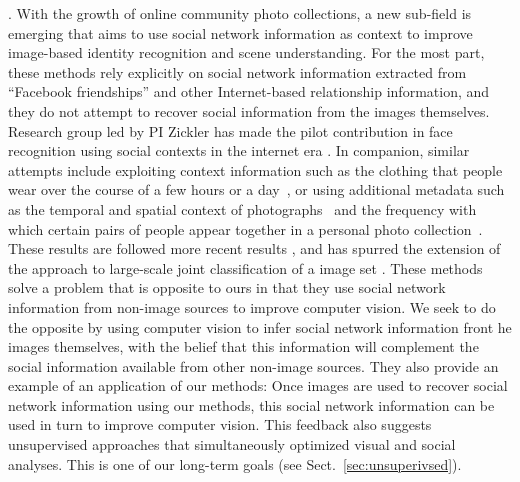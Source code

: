 . With the growth of online community photo collections, a new sub-field is emerging that aims to use social network information as context to improve image-based identity recognition and scene understanding. For the most part, these methods rely explicitly on social network information extracted from ``Facebook friendships'' and other Internet-based relationship information, and they do not attempt to recover social information from the images themselves. Research group led by PI Zickler has made the pilot contribution in face recognition using social contexts in the internet era \cite{Stone2008,Stone2010}. In companion, similar attempts include exploiting context information such as the clothing that people wear over the course of a few hours or a day~\cite{anguelov2007cir, zhang2003aah,  song2006cah, sivic2006fpr}, or using additional metadata such as the temporal and spatial context of photographs~\cite{naaman2005lcr, zhao2006apa} and the frequency with which certain pairs of people appear together in a personal photo collection~\cite{anguelov2007cir}. These results are followed more recent results \cite{Dikmen:classify,LeeBMVC2011,Poppe2012}, and has spurred the extension of the approach to large-scale joint classification of a image set \cite{McAuley:socialclassify}. These methods solve a problem that is opposite to ours in that they use social network information from non-image sources to improve computer vision. We seek to do the opposite by using computer vision to infer social network information front he images themselves, with the belief that this information will complement the social information available from other non-image sources. They also provide an example of an application of our methods: Once images are used to recover social network information using our methods, this social network information can be used in turn to improve computer vision. This feedback also suggests unsupervised approaches that simultaneously optimized visual and social analyses. This is one of our long-term goals (see Sect.~\ref{sec:unsuperivsed}).


